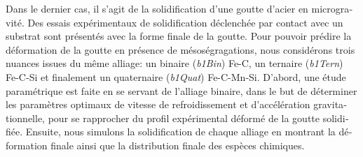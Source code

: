 \begin{otherlanguage}{french}
{Dans le dernier cas, il s'agit de la solidification d'une goutte d'acier en microgravité. 
Des essais expérimentaux de solidification déclenchée par contact avec un substrat sont présentés avec la forme finale de la goutte.
Pour pouvoir prédire la déformation de la goutte en présence de mésoségragations, nous considérons trois nuances issues du même alliage:
un binaire (\emph{b1Bin}) Fe-C, un ternaire (\emph{b1Tern}) Fe-C-Si et finalement un quaternaire (\emph{b1Quat}) Fe-C-Mn-Si.
D'abord, une étude paramétrique est faite en se servant de l'alliage binaire, dans le but de déterminer les paramètres optimaux de vitesse
de refroidissement et d'accélération gravitationnelle, pour se rapprocher du profil expérimental déformé de la goutte solidifiée.
Ensuite, nous simulons la solidification de chaque alliage en montrant la déformation finale ainsi que la distribution finale
des espèces chimiques.  

}
\end{otherlanguage}
